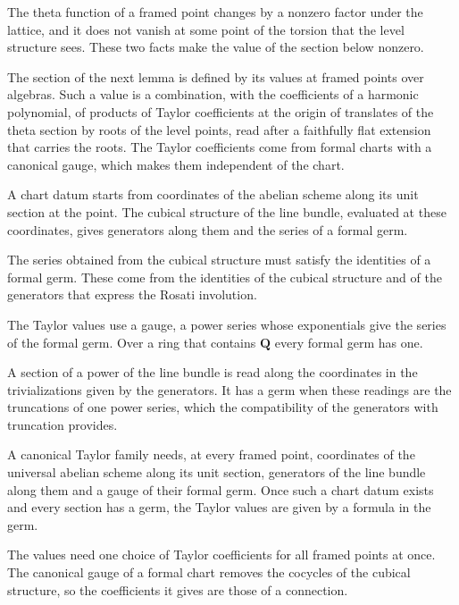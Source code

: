The theta function of a framed point changes by a nonzero factor under the lattice, and it does not vanish at some
point of the torsion that the level structure sees. These two facts make the value of the section below nonzero.

The section of the next lemma is defined by its values at framed points over algebras. Such a value is a
combination, with the coefficients of a harmonic polynomial, of products of Taylor coefficients at the origin of
translates of the theta section by roots of the level points, read after a faithfully flat extension that carries the
roots. The Taylor coefficients come from formal charts with a canonical
gauge, which makes them independent of the chart.

A chart datum starts from coordinates of the abelian scheme along its unit section at the point. The cubical
structure of the line bundle, evaluated at these coordinates, gives generators along them and the series of a formal
germ.

The series obtained from the cubical structure must satisfy the identities of a formal germ. These come from the
identities of the cubical structure and of the generators that express the Rosati involution.

The Taylor values use a gauge, a power series whose exponentials give the series of the formal germ. Over a ring that
contains $\mathbf Q$ every formal germ has one.

A section of a power of the line bundle is read along the coordinates in the trivializations given by the generators.
It has a germ when these readings are the truncations of one power series, which the compatibility of the generators
with truncation provides.

A canonical Taylor family needs, at every framed point, coordinates of the universal abelian scheme along its unit
section, generators of the line bundle along them and a gauge of their formal germ. Once such a chart datum exists and every
section has a germ, the Taylor values are given by a formula in the germ.

The values need one choice of Taylor coefficients for all framed points at once. The canonical gauge of a formal
chart removes the cocycles of the cubical structure, so the coefficients it gives are those of a connection.

